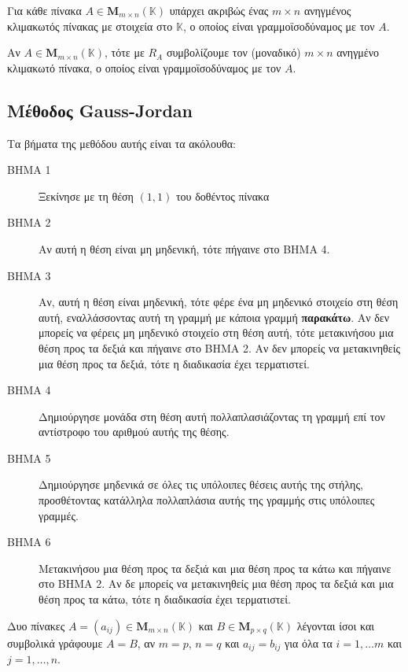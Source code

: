 \begin{thm}
  Για κάθε πίνακα $ A \in \textbf{M}_{m \times n}(\mathbb{K}) $ υπάρχει ακριβώς ένας 
  $ m \times n $ ανηγμένος κλιμακωτός πίνακας με στοιχεία στο $ \mathbb{K} $, ο οποίος 
  είναι γραμμοϊσοδύναμος με τον $A$.
\end{thm}

\begin{rem}
  Αν $ A \in \textbf{M}_{m \times n}(\mathbb{K}) $, τότε με $ R_{A} $ συμβολίζουμε τον 
  (μοναδικό) $ m \times n $ ανηγμένο κλιμακωτό πίνακα, ο οποίος είναι γραμμοϊσοδύναμος 
  με τον $A$.
\end{rem}

\subsection*{Μέθοδος Gauss-Jordan}

Τα βήματα της μεθόδου αυτής είναι τα ακόλουθα:
\begin{description}
  \item [ΒΗΜΑ 1] Ξεκίνησε με τη θέση $ (1,1) $ του δοθέντος πίνακα
  \item [ΒΗΜΑ 2] Αν αυτή η θέση είναι μη μηδενική, τότε πήγαινε στο ΒΗΜΑ 4. 
  \item [ΒΗΜΑ 3] Αν, αυτή η θέση είναι μηδενική, τότε φέρε ένα μη μηδενικό στοιχείο 
    στη θέση αυτή, εναλλάσσοντας αυτή τη γραμμή με κάποια γραμμή \textbf{παρακάτω}. 
    Αν δεν μπορείς να φέρεις μη μηδενικό στοιχείο στη θέση αυτή, τότε μετακινήσου μια 
    θέση προς τα δεξιά και πήγαινε στο ΒΗΜΑ 2. Αν δεν μπορείς να μετακινηθείς μια 
    θέση προς τα δεξιά, τότε η διαδικασία έχει τερματιστεί.
  \item [ΒΗΜΑ 4] Δημιούργησε μονάδα στη θέση αυτή πολλαπλασιάζοντας τη γραμμή επί τον 
    αντίστροφο του αριθμού αυτής της θέσης.
  \item [ΒΗΜΑ 5] Δημιούργησε μηδενικά σε όλες τις υπόλοιπες θέσεις αυτής της στήλης, 
    προσθέτοντας κατάλληλα πολλαπλάσια αυτής της γραμμής στις υπόλοιπες γραμμές.
  \item [ΒΗΜΑ 6] Μετακινήσου μια θέση προς τα δεξιά και μια θέση προς τα κάτω και πήγαινε
    στο ΒΗΜΑ 2. Αν δε μπορείς να μετακινηθείς μια θέση προς τα δεξιά και μια θέση 
    προς τα κάτω, τότε η διαδικασία έχει τερματιστεί.
\end{description}

\begin{dfn}
  Δυο πίνακες $ A = (a_{ij}) \in \textbf{M}_{m \times n}(\mathbb{K}) $ και 
  $ B \in \textbf{M}_{p \times q}(\mathbb{K}) $ λέγονται \textcolor{Col1}{ίσοι} και 
  συμβολικά γράφουμε 
  $ A=B $, αν $ m=p $, $ n=q $ και $ a_{ij} = b_{ij} $ για όλα τα $ i=1,\ldots m $ 
  και $ j=1,\ldots, n $.
\end{dfn}

